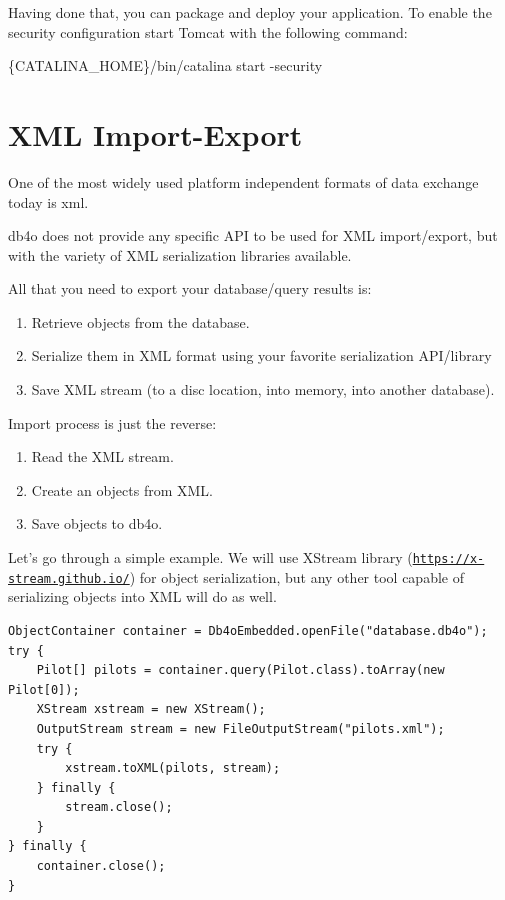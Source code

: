 Having done that, you can package and deploy your application. To enable the security configuration start Tomcat with the following command:\newline{}

\{CATALINA\_HOME\}/bin/catalina start -security \newline{}

\section{XML Import-Export}
\label{ref:platform-specific-issues-xml-import-export}

One of the most widely used platform independent formats of data exchange today is xml.

db4o does not provide any specific API to be used for XML import/export, but with the variety of XML serialization libraries available.

All that you need to export your database/query results is:

\begin{enumerate}
\item Retrieve objects from the database.
\item Serialize them in XML format using your favorite serialization API/library
\item Save XML stream (to a disc location, into memory, into another database).
\end{enumerate}

Import process is just the reverse:

\begin{enumerate}
\item Read the XML stream.
\item Create an objects from XML.
\item Save objects to db4o.
\end{enumerate}

Let's go through a simple example. We will use XStream library (\href{https://x-stream.github.io/}{\nolinkurl{https://x-stream.github.io/}}) for object serialization, but any other tool capable of serializing objects into XML will do as well.

\begin{lstlisting}
ObjectContainer container = Db4oEmbedded.openFile("database.db4o");
try {
    Pilot[] pilots = container.query(Pilot.class).toArray(new Pilot[0]);
    XStream xstream = new XStream();
    OutputStream stream = new FileOutputStream("pilots.xml");
    try {
        xstream.toXML(pilots, stream);
    } finally {
        stream.close();
    }
} finally {
    container.close();
}
\end{lstlisting}

